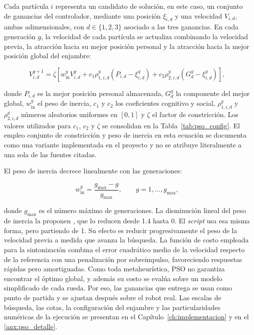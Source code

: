 Cada partícula $i$ representa un candidato de solución, en este caso, un
conjunto de ganancias del controlador, mediante una posición $\xi_{i,d}$ y una
velocidad $V_{i,d}$, ambas adimensionales, con $d\in\{1,2,3\}$ asociado a
las tres ganancias. En cada generación $g$, la velocidad de cada partícula se
actualiza combinando la velocidad previa, la atracción hacia su mejor posición
personal y la atracción hacia la mejor posición global del enjambre:

\begin{equation}
V_{i,d}^{g+1}
=
\zeta
\left[
w_{\mathrm{in}}^{g}V_{i,d}^{g}
+c_1\rho_{1,i,d}^{g}
\left(P_{i,d}-\xi_{i,d}^{g}\right)
+c_2\rho_{2,i,d}^{g}
\left(G_d^{g}-\xi_{i,d}^{g}\right)
\right],
\label{eq:pso_vel_marco_teorico}
\end{equation}

\noindent donde $P_{i,d}$ es la mejor posición personal almacenada,
$G_d^{g}$ la componente del mejor global, $w_{\mathrm{in}}^{g}$ el peso de
inercia, $c_1$ y $c_2$ los coeficientes cognitivo y social,
$\rho_{1,i,d}^{g}$ y $\rho_{2,i,d}^{g}$ números aleatorios uniformes en
$[0,1]$ y $\zeta$ el factor de constricción. Los valores utilizados para
$c_1$, $c_2$ y $\zeta$ se consolidan en la Tabla~\ref{tab:pso_config}. El
empleo conjunto de constricción y peso de inercia en esta ecuación se
documenta como una variante implementada en el proyecto y no se atribuye
literalmente a una sola de las fuentes citadas.

El peso de inercia decrece linealmente con las generaciones:

\begin{equation}
w_{\mathrm{in}}^{g}
=
\frac{g_{\max}-g}{g_{\max}},
\qquad
g=1,\ldots,g_{\max},
\label{eq:pso_inercia}
\end{equation}

\noindent donde $g_{\max}$ es el número máximo de generaciones. La disminución
lineal del peso de inercia la proponen \citet{shi1998modified}, que lo
reducen desde 1.4 hasta 0. El \textit{script} usa esa misma forma, pero partiendo de 1. Su efecto es reducir progresivamente el peso de la
velocidad previa a medida que avanza la búsqueda. La función de costo empleada
para la sintonización combina el error cuadrático medio de la velocidad
respecto de la referencia con una penalización por sobreimpulso, favoreciendo
respuestas rápidas pero amortiguadas. Como toda metaheurística, PSO no
garantiza encontrar el óptimo global, y además su costo se evalúa sobre un
modelo simplificado de cada rueda. Por eso, las ganancias que entrega se usan
como punto de partida y se ajustan después sobre el robot real. Las escalas de
búsqueda, las cotas, la
configuración del enjambre y las particularidades numéricas de la ejecución se
presentan en el Capítulo~\ref{ch:implementacion} y en el
\ref{anx:pso_detalle}.

